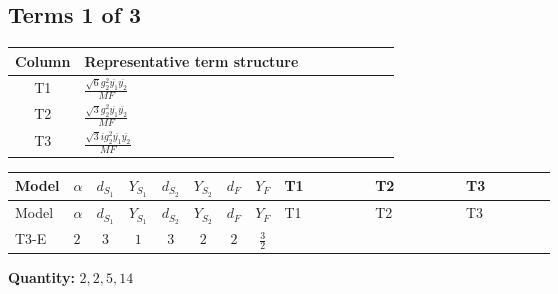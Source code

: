 \documentclass[8pt]{article}
\begin{document}
\begin{landscape}
\subsection*{Terms 1 of 3}
\begin{center}
\begin{tabular}{@{}c >{\raggedright\arraybackslash}p{0.82\linewidth}@{}}
\toprule
Column & Representative term structure \\
\midrule
T1 & \(\displaystyle \frac{\sqrt{6} g_{2}^{2} \overline{y_{1}} \overline{y_{2}}}{MF}\) \\
\midrule
T2 & \(\displaystyle \frac{\sqrt{3} g_{2}^{2} \overline{y_{1}} \overline{y_{2}}}{MF}\) \\
\midrule
T3 & \(\displaystyle \frac{\sqrt{3} i g_{2}^{2} \overline{y_{1}} \overline{y_{2}}}{MF}\) \\
\midrule
\bottomrule
\end{tabular}
\end{center}
\smallskip
\tiny
\begin{longtable}{@{}llcccccc >{\raggedright\arraybackslash}p{0.21\linewidth} >{\raggedright\arraybackslash}p{0.21\linewidth} >{\raggedright\arraybackslash}p{0.21\linewidth}@{}}
\toprule
Model & $\alpha$ & $d_{S_1}$ & $Y_{S_1}$ & $d_{S_2}$ & $Y_{S_2}$ & $d_F$ & $Y_F$ & T1 & T2 & T3 \\
\midrule
\endfirsthead
\toprule
Model & $\alpha$ & $d_{S_1}$ & $Y_{S_1}$ & $d_{S_2}$ & $Y_{S_2}$ & $d_F$ & $Y_F$ & T1 & T2 & T3 \\
\midrule
\endhead
T3-E & $2$ & $3$ & $1$ & $3$ & $2$ & $2$ & $\frac{3}{2}$ & \scriptsize\adjustbox{max width=\linewidth}{$\begin{gathered} - \frac{\sqrt{6} g_{2}^{2} \overline{y_{1}} \overline{y_{2}}}{3 MF}\end{gathered}$} & \scriptsize\adjustbox{max width=\linewidth}{$\begin{gathered} - \frac{\sqrt{3} g_{2}^{2} \overline{y_{1}} \overline{y_{2}}}{6 MF}\end{gathered}$} & \scriptsize\adjustbox{max width=\linewidth}{$\begin{gathered} - \frac{49 \sqrt{3} i g_{2}^{2} \overline{y_{1}} \overline{y_{2}}}{24 MF}\end{gathered}$} \\
\midrule
\bottomrule
\end{longtable}
\clearpage
\noindent\textbf{Quantity: }$\mathrm{2,2,5,14}$\par\smallskip

\end{landscape}
\end{document}
